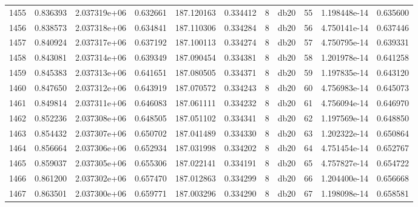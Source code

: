 \begin{tabular}{lrrrrrrlrrr}
1455 &    0.836393 &        2.037319e+06 &  0.632661 &              187.120163 &    0.334412 &       8 &         db20 &     55 &   1.198448e-14 &      0.635600 \\
1456 &    0.838573 &        2.037318e+06 &  0.634841 &              187.110306 &    0.334284 &       8 &         db20 &     56 &   4.750141e-14 &      0.637446 \\
1457 &    0.840924 &        2.037317e+06 &  0.637192 &              187.100113 &    0.334274 &       8 &         db20 &     57 &   4.750795e-14 &      0.639331 \\
1458 &    0.843081 &        2.037314e+06 &  0.639349 &              187.090454 &    0.334381 &       8 &         db20 &     58 &   1.201978e-14 &      0.641258 \\
1459 &    0.845383 &        2.037313e+06 &  0.641651 &              187.080505 &    0.334371 &       8 &         db20 &     59 &   1.197835e-14 &      0.643120 \\
1460 &    0.847650 &        2.037312e+06 &  0.643919 &              187.070572 &    0.334243 &       8 &         db20 &     60 &   4.756983e-14 &      0.645073 \\
1461 &    0.849814 &        2.037311e+06 &  0.646083 &              187.061111 &    0.334232 &       8 &         db20 &     61 &   4.756094e-14 &      0.646970 \\
1462 &    0.852236 &        2.037308e+06 &  0.648505 &              187.051102 &    0.334341 &       8 &         db20 &     62 &   1.197569e-14 &      0.648850 \\
1463 &    0.854432 &        2.037307e+06 &  0.650702 &              187.041489 &    0.334330 &       8 &         db20 &     63 &   1.202322e-14 &      0.650864 \\
1464 &    0.856664 &        2.037306e+06 &  0.652934 &              187.031998 &    0.334202 &       8 &         db20 &     64 &   4.751454e-14 &      0.652767 \\
1465 &    0.859037 &        2.037305e+06 &  0.655306 &              187.022141 &    0.334191 &       8 &         db20 &     65 &   4.757827e-14 &      0.654722 \\
1466 &    0.861200 &        2.037302e+06 &  0.657470 &              187.012863 &    0.334299 &       8 &         db20 &     66 &   1.204400e-14 &      0.656668 \\
1467 &    0.863501 &        2.037300e+06 &  0.659771 &              187.003296 &    0.334290 &       8 &         db20 &     67 &   1.198098e-14 &      0.658581 \\

\end{tabular}
